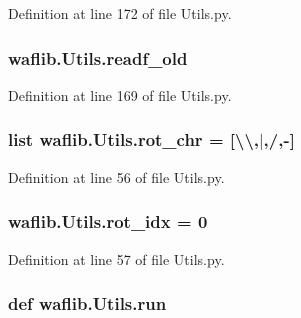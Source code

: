 Definition at line 172 of file Utils.\+py.

\subsubsection[{\texorpdfstring{readf\+\_\+old}{readf_old}}]{\setlength{\rightskip}{0pt plus 5cm}waflib.\+Utils.\+readf\+\_\+old}\hypertarget{namespacewaflib_1_1_utils_a3bcc4295329e074ef499cde582b1007f}{}\label{namespacewaflib_1_1_utils_a3bcc4295329e074ef499cde582b1007f}


Definition at line 169 of file Utils.\+py.

\subsubsection[{\texorpdfstring{rot\+\_\+chr}{rot_chr}}]{\setlength{\rightskip}{0pt plus 5cm}list waflib.\+Utils.\+rot\+\_\+chr = \mbox{[}\textquotesingle{}\textbackslash{}\textbackslash{}\textquotesingle{},\textquotesingle{}$\vert$\textquotesingle{},\textquotesingle{}/\textquotesingle{},\textquotesingle{}-\/\textquotesingle{}\mbox{]}}\hypertarget{namespacewaflib_1_1_utils_ada63dd48800b61412a762dfe4ea4d6c4}{}\label{namespacewaflib_1_1_utils_ada63dd48800b61412a762dfe4ea4d6c4}


Definition at line 56 of file Utils.\+py.

\subsubsection[{\texorpdfstring{rot\+\_\+idx}{rot_idx}}]{ waflib.\+Utils.\+rot\+\_\+idx = 0}\hypertarget{namespacewaflib_1_1_utils_a3f8bc515e993d1c3241dad98231a28a4}{}\label{namespacewaflib_1_1_utils_a3f8bc515e993d1c3241dad98231a28a4}


Definition at line 57 of file Utils.\+py.

\subsubsection[{\texorpdfstring{run}{run}}]{\setlength{\rightskip}{0pt plus 5cm}def waflib.\+Utils.\+run}\hypertarget{namespacewaflib_1_1_utils_a6200590837191af7edebc88e527caa98}{}\label{namespacewaflib_1_1_utils_a6200590837191af7edebc88e527caa98}


